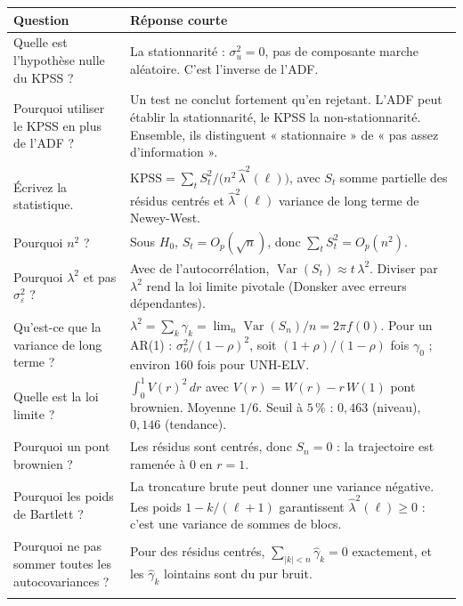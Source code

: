 \documentclass[11pt,a4paper]{article}
\newcommand{\Var}{\operatorname{Var}}
\newcommand{\KPSS}{\mathrm{KPSS}}
\theoremstyle{definition}
\begin{document}
\begin{center}
\small
\begin{longtable}{@{}>{\raggedright}p{5.2cm}>{\raggedright\arraybackslash}p{10.3cm}@{}}
\toprule
Question & Réponse courte \\
\midrule
\endhead
Quelle est l'hypothèse nulle du KPSS ? & La stationnarité : $\sigma_u^2 = 0$, pas de composante marche aléatoire. C'est l'inverse de l'ADF. \\
\addlinespace
Pourquoi utiliser le KPSS en plus de l'ADF ? & Un test ne conclut fortement qu'en rejetant. L'ADF peut établir la stationnarité, le KPSS la non-stationnarité. Ensemble, ils distinguent « stationnaire » de « pas assez d'information ». \\
\addlinespace
Écrivez la statistique. & $\KPSS = \sum_t S_t^2 / \bigl(n^2\,\hat\lambda^2(\ell)\bigr)$, avec $S_t$ somme partielle des résidus centrés et $\hat\lambda^2(\ell)$ variance de long terme de Newey-West. \\
\addlinespace
Pourquoi $n^2$ ? & Sous $H_0$, $S_t = O_p(\sqrt n)$, donc $\sum_t S_t^2 = O_p(n^2)$. \\
\addlinespace
Pourquoi $\lambda^2$ et pas $\sigma_\varepsilon^2$ ? & Avec de l'autocorrélation, $\Var(S_t) \approx t\,\lambda^2$. Diviser par $\lambda^2$ rend la loi limite pivotale (Donsker avec erreurs dépendantes). \\
\addlinespace
Qu'est-ce que la variance de long terme ? & $\lambda^2 = \sum_k \gamma_k = \lim_n \Var(S_n)/n = 2\pi f(0)$. Pour un AR(1) : $\sigma_\nu^2/(1-\rho)^2$, soit $(1+\rho)/(1-\rho)$ fois $\gamma_0$ ; environ $160$ fois pour UNH-ELV. \\
\addlinespace
Quelle est la loi limite ? & $\int_0^1 V(r)^2\,dr$ avec $V(r) = W(r) - r\,W(1)$ pont brownien. Moyenne $1/6$. Seuil à $5\,\%$ : $0{,}463$ (niveau), $0{,}146$ (tendance). \\
\addlinespace
Pourquoi un pont brownien ? & Les résidus sont centrés, donc $S_n = 0$ : la trajectoire est ramenée à $0$ en $r = 1$. \\
\addlinespace
Pourquoi les poids de Bartlett ? & La troncature brute peut donner une variance négative. Les poids $1 - k/(\ell+1)$ garantissent $\hat\lambda^2(\ell) \ge 0$ : c'est une variance de sommes de blocs. \\
\addlinespace
Pourquoi ne pas sommer toutes les autocovariances ? & Pour des résidus centrés, $\sum_{|k|<n}\hat\gamma_k = 0$ exactement, et les $\hat\gamma_k$ lointains sont du pur bruit. \\
\addlinespace

\end{longtable}
\end{center}
\end{document}
